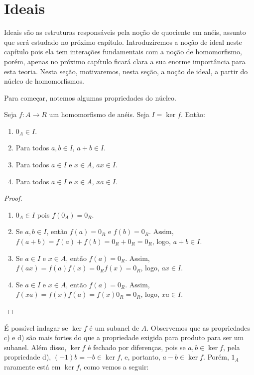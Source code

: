 \section{Ideais}
Ideais são as estruturas responsáveis pela noção de quociente em anéis, assunto que será estudado no próximo capítulo.
Introduziremos a noção de ideal neste capítulo pois ela tem interações fundamentais com a noção de homomorfismo, porém, apenas no próximo capítulo ficará clara a sua enorme importância para esta teoria.
Nesta seção, motivaremos, nesta seção, a noção de ideal, a partir do núcleo de homomorfismos.

Para começar, notemos algumas propriedades do núcleo.

\begin{prop}
Seja $f:A\rightarrow R$ um homomorfismo de anéis. Seja $I=\ker f$. Então:

\begin{enumerate}[label=\alph*)]
    \item $0_A \in I$.
    \item Para todos $a, b \in I$, $a+b \in I$.
    \item Para todos $a \in I$ e $x \in A$, $ax \in I$.
    \item Para todos $a \in I$ e $x \in A$, $xa \in I$.
\end{enumerate}
\end{prop}

\begin{proof}
    \begin{enumerate}[label=\alph*)]
        \item $0_A \in I$ pois $f(0_A)=0_R$.
        \item Se $a, b \in I$, então $f(a)=0_R$ e $f(b)=0_R$. Assim, $f(a+b)=f(a)+f(b)=0_R+0_R=0_R$, logo, $a+b\in I$.
        \item Se $a \in I$ e $x \in A$, então $f(a)=0_R$. Assim, $f(ax)=f(a)f(x)=0_Rf(x)=0_R$, logo, $ax\in I$.
        \item Se $a \in I$ e $x \in A$, então $f(a)=0_R$. Assim, $f(xa)=f(x)f(a)=f(x)0_R=0_R$, logo, $xa\in I$.
    \end{enumerate}
\end{proof}

É possível indagar se $\ker f$ é um subanel de $A$. Observemos que as propriedades c) e d) são mais fortes do que a propriedade exigida para produto para ser um subanel. Além disso, $\ker f$ é fechado por diferenças, pois se $a, b \in \ker f$, pela propriedade d), $(-1)b=-b\in \ker f$, e, portanto, $a-b \in \ker f$. Porém, $1_A$ raramente está em $\ker f$, como vemos a seguir:

